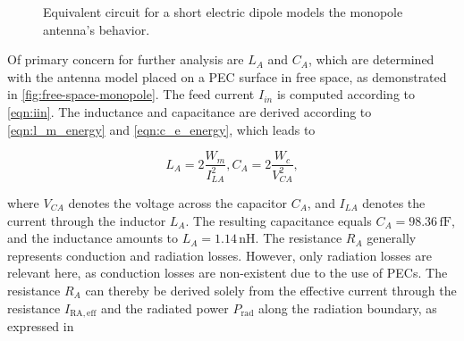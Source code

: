 \begin{figure}[h]
	\centering
	\caption{Equivalent circuit for a short electric dipole models 
		the monopole antenna's behavior.}
	\label{fig:eqc_simple_monopole}
\end{figure}

Of primary concern for further analysis are $L_A$ and $C_A$, which are determined with the antenna model placed on a PEC surface in free space, as demonstrated in \autoref{fig:free-space-monopole}. The feed current $I_{in}$ is computed according to \eqref{eqn:iin}. The inductance and capacitance are derived according to 
\eqref{eqn:l_m_energy} and \eqref{eqn:c_e_energy}, which leads to 

\begin{subequations}
	\begin{equation}
		L_A = 2\frac{W_m}{I_{LA}^2},
	\end{equation}
	\begin{equation}
		C_A = 2\frac{W_c}{V_{CA}^2},
	\end{equation}
\end{subequations}

where $V_{CA}$ denotes the voltage across the capacitor 
$C_A$, and $I_{LA}$ denotes the current through the inductor $L_A$. The resulting capacitance equals $C_A=98.36\,\mathrm{fF}$, and the inductance amounts to $L_A=1.14\,\mathrm{nH}$. The resistance $R_A$ generally represents conduction and radiation losses. However, only radiation losses are relevant here, as conduction losses are non-existent due to the use of PECs. The resistance $R_A$ can thereby be derived solely from the effective current through the resistance $I_\mathrm{RA,eff}$ and the radiated power $P_\mathrm{rad}$ along the radiation boundary, as expressed in 

